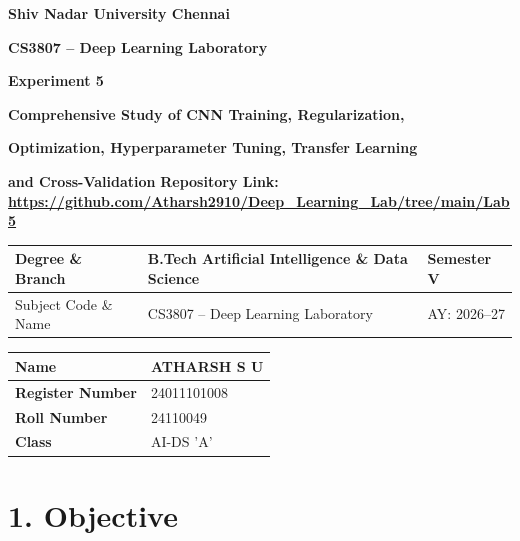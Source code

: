 \documentclass[10pt]{article}
\begin{document}

\begin{center}

{\large\textbf{Shiv Nadar University Chennai}}

\vspace{2mm}

{\normalsize\textbf{CS3807 -- Deep Learning Laboratory}}

\vspace{2mm}

{\large\textbf{Experiment 5}}

\vspace{1mm}

{\normalsize\textbf{Comprehensive Study of CNN Training, Regularization,}}

{\normalsize\textbf{Optimization, Hyperparameter Tuning, Transfer Learning}}

{\normalsize\textbf{and Cross-Validation}}
\textbf{Repository Link:}
\textbf{\url{https://github.com/Atharsh2910/Deep_Learning_Lab/tree/main/Lab5}
}

\end{center}

\vspace{3mm}

\begin{tabular}{|p{3.8cm}|p{8cm}|p{2cm}|}
\hline
Degree \& Branch & B.Tech Artificial Intelligence \& Data Science & Semester V\\ \hline
Subject Code \& Name & CS3807 -- Deep Learning Laboratory & AY: 2026--27\\ \hline
\end{tabular}

\begin{tabular}{|p{3.5cm}|p{8cm}|}
\hline
\textbf{Name} & {ATHARSH S U}\\ \hline
\textbf{Register Number} &{24011101008} \\ \hline
\textbf{Roll Number} &{24110049} \\ \hline
\textbf{Class} & {AI-DS 'A'}\\ \hline
\end{tabular}
\vspace{3mm}

\section*{1. Objective}
\end{document}

